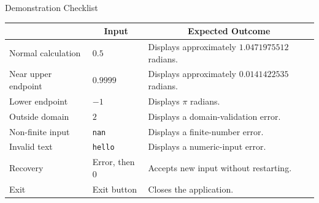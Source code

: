 \documentclass[aspectratio=169]{beamer}
\newcommand{\tableheader}[1]{%
    \multicolumn{1}{c}{\color{white}\textbf{#1}}%
}
\begin{document}
\begin{frame}{Demonstration Checklist}
\small
{}
\begin{tabular}{p{}p{}p{}}
\rowcolor{navy}
\tableheader{Case} & \tableheader{Input} & \tableheader{Expected Outcome} \\
\toprule
Normal calculation & \(0.5\) & Displays approximately \(1.0471975512\) radians. \\
Near upper endpoint & \(0.9999\) & Displays approximately \(0.0141422535\) radians. \\
Lower endpoint & \(-1\) & Displays \(\pi\) radians. \\
Outside domain & \(2\) & Displays a domain-validation error. \\
Non-finite input & \texttt{nan} & Displays a finite-number error. \\
Invalid text & \texttt{hello} & Displays a numeric-input error. \\
Recovery & Error, then \(0\) & Accepts new input without restarting. \\
Exit & Exit button & Closes the application. \\
\bottomrule
\end{tabular}
\end{frame}
\end{document}
